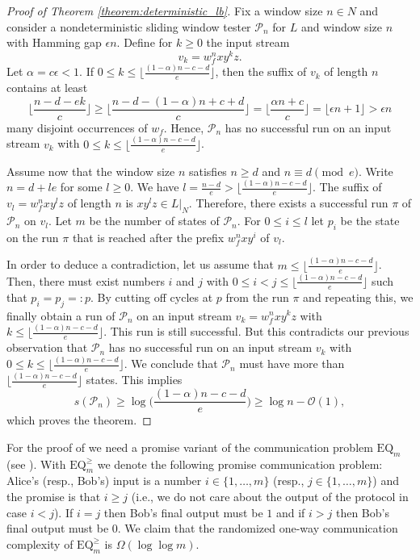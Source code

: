 \documentclass{theoretics}
\renewcommand{\O}{\mathcal{O}}
\renewcommand{\P}{\mathcal{P}}
\renewcommand{\geq}{\geqslant}
\renewcommand{\leq}{\leqslant}
\renewcommand{\le}{\leq}
\begin{document}
\begin{proof}[Proof of Theorem \ref{theorem:deterministic_lb}]
Fix a window size $n\in N$
and consider a nondeterministic sliding window tester $\P_n$ for $L$
and window size $n$ with Hamming gap $\epsilon n$.
Define for $k \geq 0$ the input stream
\[
	v_k = w_f^n x y^k z .
\]
Let $\alpha = c \epsilon < 1$.
If $0 \le k \le \lfloor \frac{(1-\alpha) n - c - d}{e} \rfloor$, then the suffix of $v_k$ of length $n$ 
contains at least
\[
\bigg\lfloor\frac{n - d - e k}{c} \bigg\rfloor \geq 
\bigg\lfloor\frac{n - d - (1-\alpha) n + c + d}{c} \bigg\rfloor = 
\bigg\lfloor\frac{\alpha n + c}{c} \bigg\rfloor = \lfloor \epsilon n + 1 \rfloor > \epsilon n
\]
many disjoint occurrences of $w_f$.
Hence, $\P_n$ has no successful run on an input stream $v_k$ with
$0 \le k \le \lfloor \frac{(1-\alpha) n - c - d}{e} \rfloor$.

Assume now that the window size $n$ satisfies $n \geq d$ and $n \equiv d \pmod e$.
Write $n = d + l e$ for some $l \geq 0$.
We have $l = \frac{n-d}{e} > \lfloor \frac{(1-\alpha) n - c - d}{e} \rfloor$.
The suffix of $v_l = w_f^n x y^l z$ of length $n$ is $x y^l z \in L|_N$.
Therefore, there exists a successful run $\pi$ of $\P_n$ on $v_l$.
Let $m$ be the number of states of $\P_n$.
For $0 \leq i \leq l$ let $p_i$ be the state on the run $\pi$ that is reached
after the prefix $w_f^n x y^i$ of $v_l$.

In order to deduce a contradiction, let us assume that
$m \leq \lfloor \frac{(1-\alpha) n - c - d}{e} \rfloor$.
Then, there must exist numbers $i$ and $j$ with $0 \leq i < j \leq \lfloor \frac{(1-\alpha) n - c - d}{e} \rfloor$
such that $p_i = p_j =: p$. By cutting off cycles at $p$ from the run $\pi$ and repeating this,
we finally obtain a run of $\P_n$ on 
an input stream  $v_k = w_f^n x y^k z$ with $k \leq \lfloor \frac{(1-\alpha) n - c - d}{e} \rfloor$.
This run is still successful. But this contradicts our previous observation that
$\P_n$ has no successful run on an input stream $v_k$ with
$0 \le k \le \lfloor \frac{(1-\alpha) n - c - d}{e} \rfloor$.
We conclude that $\P_n$ must have more than $\lfloor \frac{(1-\alpha) n - c - d}{e} \rfloor$ states.
This implies
\[
s(\P_n) \geq \log \bigg( \frac{(1-\alpha) n - c - d}{e} \bigg) \geq \log n - \O(1) ,
\]
which proves the theorem.
\end{proof}

For the proof of  we need a promise variant of the communication problem $\mathrm{EQ}_m$ (see ).
With $\mathrm{EQ}^{\geq}_m$  we denote the following promise communication problem: Alice's (resp., Bob's) input is a number $i \in \{1,\ldots,m\}$ 
(resp., $j \in \{1,\ldots,m\}$) and the promise is that $i \geq j$ (i.e., we do not care about the output of the protocol in case $i < j$). 
If $i = j$ then Bob's final output must be $1$ and if $i > j$ then Bob's final output must be $0$.
We claim that the randomized one-way communication complexity of $\mathrm{EQ}^{\geq}_m$ is $\Omega(\log \log m)$. 
\end{document}
